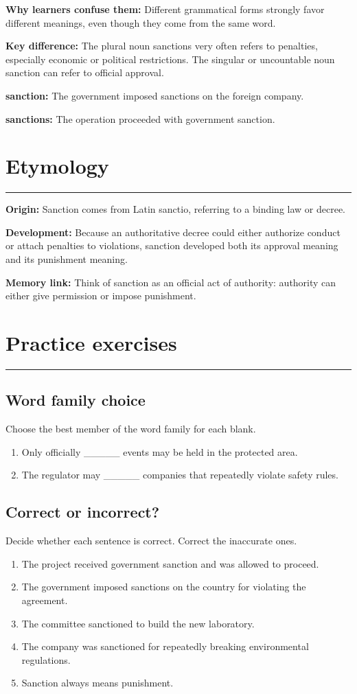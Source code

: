 \documentclass[11pt]{article}
\newcommand{\sectionrule}{\par\vspace{-0.5em}\noindent\textcolor{Accent}{\rule{\linewidth}{0.6pt}}\par}
\begin{document}
\textbf{Why learners confuse them:} Different grammatical forms strongly favor different meanings, even though they come from the same word.

\textbf{Key difference:} The plural noun sanctions very often refers to penalties, especially economic or political restrictions. The singular or uncountable noun sanction can refer to official approval.

\textbf{sanction:} The government imposed sanctions on the foreign company.

\textbf{sanctions:} The operation proceeded with government sanction.

\section{Etymology}
\sectionrule
\textbf{Origin:} Sanction comes from Latin sanctio, referring to a binding law or decree.

\textbf{Development:} Because an authoritative decree could either authorize conduct or attach penalties to violations, sanction developed both its approval meaning and its punishment meaning.

\textbf{Memory link:} Think of sanction as an official act of authority: authority can either give permission or impose punishment.

\section{Practice exercises}
\sectionrule
\subsection{Word family choice}
Choose the best member of the word family for each blank.

\begin{enumerate}
  \item Only officially \_\_\_\_\_ events may be held in the protected area.
  \item The regulator may \_\_\_\_\_ companies that repeatedly violate safety rules.
\end{enumerate}

\subsection{Correct or incorrect?}
Decide whether each sentence is correct. Correct the inaccurate ones.

\begin{enumerate}
  \item The project received government sanction and was allowed to proceed.
  \item The government imposed sanctions on the country for violating the agreement.
  \item The committee sanctioned to build the new laboratory.
  \item The company was sanctioned for repeatedly breaking environmental regulations.
  \item Sanction always means punishment.
\end{enumerate}
\end{document}

